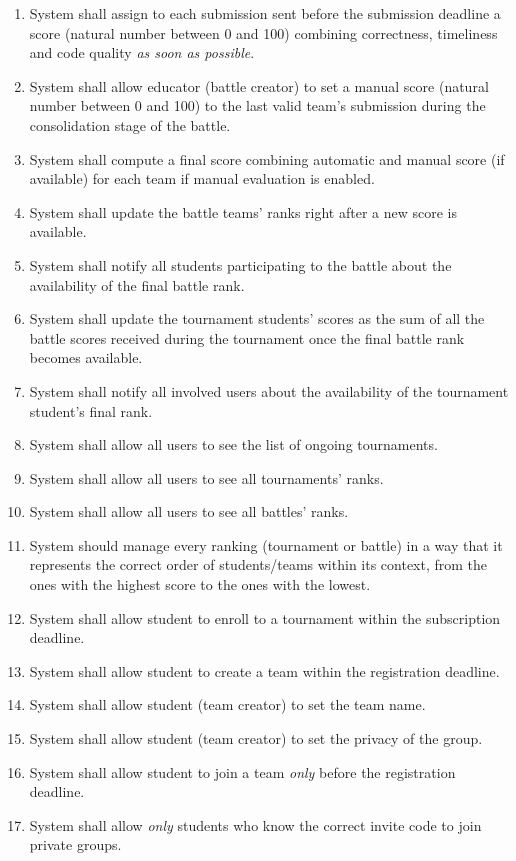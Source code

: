 \begin{enumerate}[label=$\bullet$ \textbf{R\arabic*:}]
    \item System shall assign to each submission sent before the submission deadline a score (natural number between 0 and 100) combining correctness, timeliness and code quality \textit{as soon as possible}.
    \item System shall allow educator (battle creator) to set a manual score (natural number between 0 and 100) to the last valid team’s submission during the consolidation stage of the battle.
    \item System shall compute a final score combining automatic and manual score (if available) for each team if manual evaluation is enabled.
    \item System shall update the battle teams’ ranks right after a new score is available.
    \item System shall notify all students participating to the battle about the availability of the final battle rank.
    \item System shall update the tournament students’ scores as the sum of all the battle scores received during the tournament once the final battle rank becomes available.
    \item System shall notify all involved users about the availability of the tournament student’s final rank.
    \item System shall allow all users to see the list of ongoing tournaments.
    \item System shall allow all users to see all tournaments’ ranks.
    \item System shall allow all users to see all battles' ranks.
    \item System should manage every ranking (tournament or battle) in a way that it represents the correct order of students/teams within its context, from the ones with the highest score to the ones with the lowest.
    \item System shall allow student to enroll to a tournament within the subscription deadline.
    \item System shall allow student to create a team within the registration deadline.
    \item System shall allow student (team creator) to set the team name.
    \item System shall allow student (team creator) to set the privacy of the group.
    \item System shall allow student to join a team \textit{only} before the registration deadline.
    \item System shall allow \textit{only} students who know the correct invite code to join private groups.

\end{enumerate}
